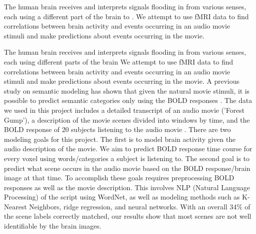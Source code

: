 \par The human brain receives and interprets signals flooding in from various senses, each using a different part of the brain to . We attempt to use fMRI data to find correlations between brain activity and events occurring in an audio movie stimuli and make predictions about events occurring in the movie. 

\par The human brain receives and interprets signals flooding in from various senses, each using different parts of the brain  We attempt to use fMRI data to find correlations between brain activity and events occurring in an audio movie stimuli and make predictions about events occurring in the movie. A previous study on semantic modeling has shown that given the natural movie stimuli, it is possible to predict semantic categories only using the BOLD responses \cite{stansbury2013neuron}. The data we used in this project includes a detailed transcript of an audio movie ('Forest Gump'), a description of the movie scenes divided into windows by time, and the BOLD response of 20 subjects listening to the audio movie \cite{Hanke}. There are two modeling goals for this project. The first is to model brain activity given the audio description of the movie. We aim to predict BOLD response time course for every voxel using words/categories a subject is listening to. The second goal is to predict what scene occurs in the audio movie based on the BOLD response/brain image at that time. To accomplish these goals requires preprocessing BOLD responses as well as the movie description. This involves NLP (Natural Language Processing) of the script using WordNet, as well as modeling methods such as K-Nearest Neighbors, ridge regression, and neural networks. With an overall 34$\%$ of the scene labels correctly matched, our results show that most scenes are not well identifiable by the brain images. 

